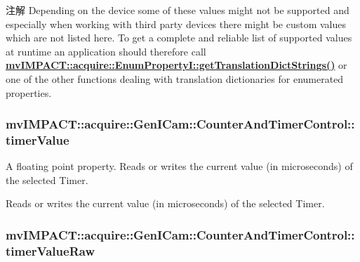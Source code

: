\begin{DoxyNote}{注解}
Depending on the device some of these values might not be supported and especially when working with third party devices there might be custom values which are not listed here. To get a complete and reliable list of supported values at runtime an application should therefore call {\bfseries \hyperlink{classmv_i_m_p_a_c_t_1_1acquire_1_1_enum_property_i_a0ba6ccbf5ee69784d5d0b537924d26b6}{mv\+I\+M\+P\+A\+C\+T\+::acquire\+::\+Enum\+Property\+I\+::get\+Translation\+Dict\+Strings()}} or one of the other functions dealing with translation dictionaries for enumerated properties. 
\end{DoxyNote}
\hypertarget{classmv_i_m_p_a_c_t_1_1acquire_1_1_gen_i_cam_1_1_counter_and_timer_control_a21f6143f2f21f2d22394455a9df22a42}{
\subsubsection[{timer\+Value}]{ mv\+I\+M\+P\+A\+C\+T\+::acquire\+::\+Gen\+I\+Cam\+::\+Counter\+And\+Timer\+Control\+::timer\+Value}}\label{classmv_i_m_p_a_c_t_1_1acquire_1_1_gen_i_cam_1_1_counter_and_timer_control_a21f6143f2f21f2d22394455a9df22a42}


A floating point property. Reads or writes the current value (in microseconds) of the selected Timer. 

Reads or writes the current value (in microseconds) of the selected Timer. \hypertarget{classmv_i_m_p_a_c_t_1_1acquire_1_1_gen_i_cam_1_1_counter_and_timer_control_a550a983e7334e89b755076bcee3cf80d}{
\subsubsection[{timer\+Value\+Raw}]{ mv\+I\+M\+P\+A\+C\+T\+::acquire\+::\+Gen\+I\+Cam\+::\+Counter\+And\+Timer\+Control\+::timer\+Value\+Raw}}\label{classmv_i_m_p_a_c_t_1_1acquire_1_1_gen_i_cam_1_1_counter_and_timer_control_a550a983e7334e89b755076bcee3cf80d}


